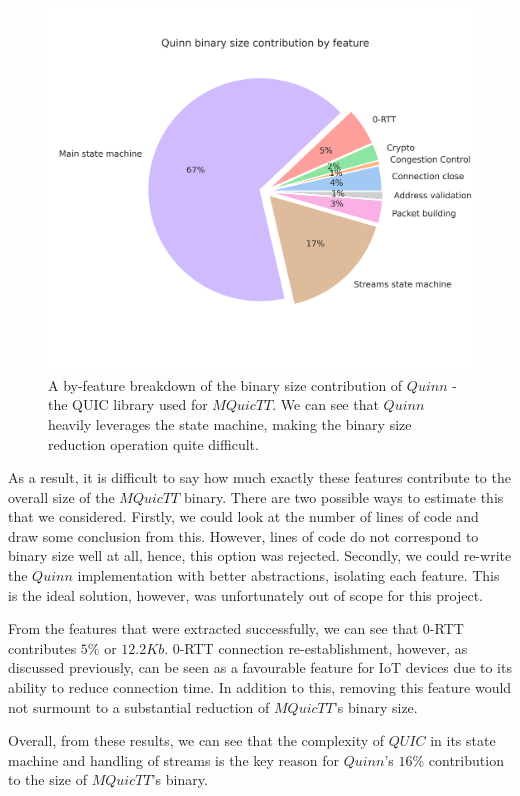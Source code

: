 \begin{figure}[t]
    \centering
    \includegraphics[width=0.75\linewidth]{images/mquictt_binary_by_function.png}
    \caption{A by-feature breakdown of the binary size contribution of $Quinn$ - the QUIC library used for $MQuicTT$. We can see that $Quinn$ heavily leverages the state machine, making the binary size reduction operation quite difficult.}
    \label{fig:mquictt_bin_func}
\end{figure}

As a result, it is difficult to say how much exactly these features contribute to the overall size of the $MQuicTT$ binary.
There are two possible ways to estimate this that we considered.
Firstly, we could look at the number of lines of code and draw some conclusion from this.
However, lines of code do not correspond to binary size well at all, hence, this option was rejected.
Secondly, we could re-write the $Quinn$ implementation with better abstractions, isolating each feature.
This is the ideal solution, however, was unfortunately out of scope for this project.

From the features that were extracted successfully, we can see that 0-RTT contributes $5\%$ or $12.2Kb$.
0-RTT connection re-establishment, however, as discussed previously, can be seen as a favourable feature for IoT devices due to its ability to reduce connection time.
In addition to this, removing this feature would not surmount to a substantial reduction of $MQuicTT$'s binary size.

Overall, from these results, we can see that the complexity of $QUIC$ in its state machine and handling of streams is the key reason for $Quinn$'s $16\%$ contribution to the size of $MQuicTT$'s binary.

